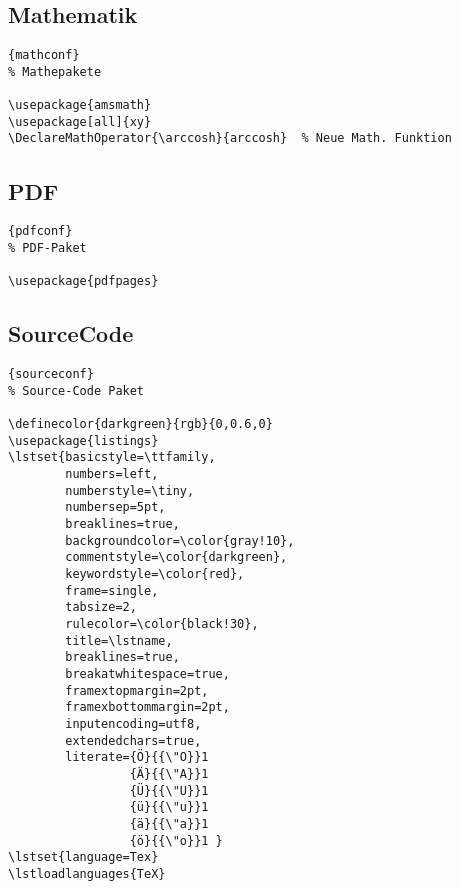 \subsection{Mathematik}

\begin{center}
\begin{lstlisting}[caption=Mathematik]{mathconf}
% Mathepakete

\usepackage{amsmath}
\usepackage[all]{xy}
\DeclareMathOperator{\arccosh}{arccosh}  % Neue Math. Funktion
\end{lstlisting}
\end{center}

\subsection{PDF}

\begin{center}
\begin{lstlisting}[caption=PDF-Paket]{pdfconf}
% PDF-Paket

\usepackage{pdfpages}
\end{lstlisting}
\end{center}

\subsection{SourceCode}

\begin{center}
\begin{lstlisting}[caption=Source-Code Paket]{sourceconf}
% Source-Code Paket

\definecolor{darkgreen}{rgb}{0,0.6,0}
\usepackage{listings} 
\lstset{basicstyle=\ttfamily,
        numbers=left,
        numberstyle=\tiny, 
        numbersep=5pt,
        breaklines=true,
        backgroundcolor=\color{gray!10},
        commentstyle=\color{darkgreen},
        keywordstyle=\color{red},
        frame=single,
        tabsize=2,
        rulecolor=\color{black!30},
        title=\lstname,
        breaklines=true,
        breakatwhitespace=true,
        framextopmargin=2pt,
        framexbottommargin=2pt,
        inputencoding=utf8,
        extendedchars=true,
        literate={Ö}{{\"O}}1
                 {Ä}{{\"A}}1
                 {Ü}{{\"U}}1
                 {ü}{{\"u}}1
                 {ä}{{\"a}}1
                 {ö}{{\"o}}1 }
\lstset{language=Tex}
\lstloadlanguages{TeX}
\end{lstlisting}
\end{center}

